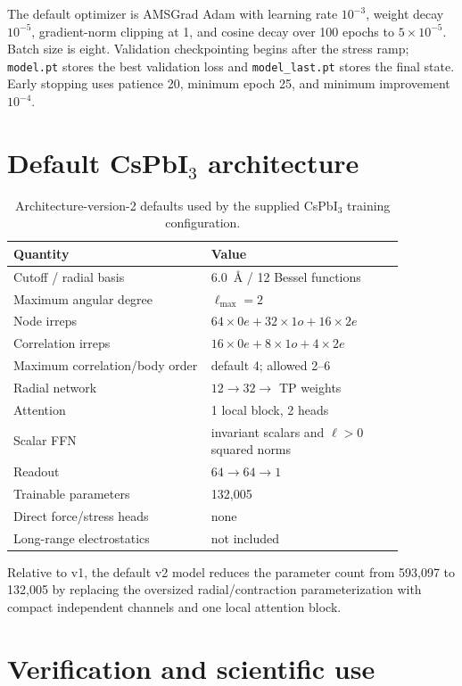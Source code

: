 \documentclass[10pt]{article}
\begin{document}
The default optimizer is AMSGrad Adam with learning rate $10^{-3}$, weight decay
$10^{-5}$, gradient-norm clipping at 1, and cosine decay over 100 epochs to
$5\times10^{-5}$. Batch size is eight. Validation checkpointing begins after the
stress ramp; \texttt{model.pt} stores the best validation loss and
\texttt{model\_last.pt} stores the final state. Early stopping uses patience 20,
minimum epoch 25, and minimum improvement $10^{-4}$.

\section{Default CsPbI\texorpdfstring{$_3$}{3} architecture}

\begin{table}[h]
\centering
\small
\begin{tabular}{>{\raggedright\arraybackslash}p{0.44\linewidth}p{0.43\linewidth}}
\toprule
Quantity & Value \\
\midrule
Cutoff / radial basis & 6.0~\AA{} / 12 Bessel functions \\
Maximum angular degree & $\ell_{\max}=2$ \\
Node irreps & $64\times0e+32\times1o+16\times2e$ \\
Correlation irreps & $16\times0e+8\times1o+4\times2e$ \\
Maximum correlation/body order & default 4; allowed 2--6 \\
Radial network & $12\rightarrow32\rightarrow$ TP weights \\
Attention & 1 local block, 2 heads \\
Scalar FFN & invariant scalars and $\ell>0$ squared norms \\
Readout & $64\rightarrow64\rightarrow1$ \\
Trainable parameters & 132,005 \\
Direct force/stress heads & none \\
Long-range electrostatics & not included \\
\bottomrule
\end{tabular}
\caption{Architecture-version-2 defaults used by the supplied CsPbI$_3$
training configuration.}
\end{table}

Relative to v1, the default v2 model reduces the parameter count from 593,097
to 132,005 by replacing the oversized radial/contraction parameterization with
compact independent channels and one local attention block.

\section{Verification and scientific use}
\end{document}

